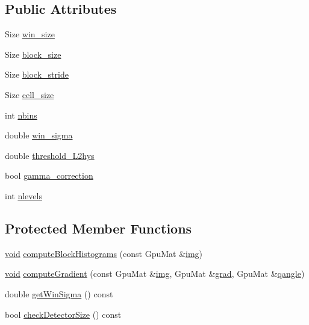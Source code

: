 \subsection*{Public Attributes}
\begin{DoxyCompactItemize}
\item 
Size \hyperlink{structcv_1_1gpu_1_1HOGDescriptor_a81c175ea3b25ddf619d5a693c6b011b0}{win\-\_\-size}
\item 
Size \hyperlink{structcv_1_1gpu_1_1HOGDescriptor_a2ffce0472743334cd00683e3ebf1aee5}{block\-\_\-size}
\item 
Size \hyperlink{structcv_1_1gpu_1_1HOGDescriptor_a64bd53b911a4b5399cf015b409ba1e85}{block\-\_\-stride}
\item 
Size \hyperlink{structcv_1_1gpu_1_1HOGDescriptor_ae9f565c6b25defa6a52ddabfd61bccb1}{cell\-\_\-size}
\item 
int \hyperlink{structcv_1_1gpu_1_1HOGDescriptor_a40800ea71ba0552bb8af9189f2c5fdf6}{nbins}
\item 
double \hyperlink{structcv_1_1gpu_1_1HOGDescriptor_a54487b481e329b2dc0d8d018a988b5ff}{win\-\_\-sigma}
\item 
double \hyperlink{structcv_1_1gpu_1_1HOGDescriptor_a7b1bb51bd628992aa16a775209062def}{threshold\-\_\-\-L2hys}
\item 
bool \hyperlink{structcv_1_1gpu_1_1HOGDescriptor_ad98fee76f0f3f497065f38a9a52af09c}{gamma\-\_\-correction}
\item 
int \hyperlink{structcv_1_1gpu_1_1HOGDescriptor_a8d4190de991a722004da4a8e724dffd9}{nlevels}
\end{DoxyCompactItemize}
\subsection*{Protected Member Functions}
\begin{DoxyCompactItemize}
\item 
\hyperlink{legacy_8hpp_a8bb47f092d473522721002c86c13b94e}{void} \hyperlink{structcv_1_1gpu_1_1HOGDescriptor_a4d5526138980f1bb865f4ad3906234cb}{compute\-Block\-Histograms} (const Gpu\-Mat \&\hyperlink{legacy_8hpp_a5349238b3772bed6eae0fda3117ccfef}{img})
\item 
\hyperlink{legacy_8hpp_a8bb47f092d473522721002c86c13b94e}{void} \hyperlink{structcv_1_1gpu_1_1HOGDescriptor_af139db5389e67e216af266e48b256009}{compute\-Gradient} (const Gpu\-Mat \&\hyperlink{legacy_8hpp_a5349238b3772bed6eae0fda3117ccfef}{img}, Gpu\-Mat \&\hyperlink{structcv_1_1gpu_1_1HOGDescriptor_aa9cedc881b28b3835a546954c29f6fcc}{grad}, Gpu\-Mat \&\hyperlink{structcv_1_1gpu_1_1HOGDescriptor_a706ce2936996876619084fac54e61464}{qangle})
\item 
double \hyperlink{structcv_1_1gpu_1_1HOGDescriptor_a395df751b32284630c866324571c4a8b}{get\-Win\-Sigma} () const 
\item 
bool \hyperlink{structcv_1_1gpu_1_1HOGDescriptor_a720ba7d1673c0331444dae2b336d1c53}{check\-Detector\-Size} () const 
\end{DoxyCompactItemize}
